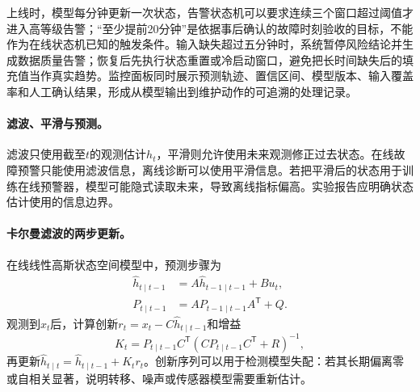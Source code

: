 上线时，模型每分钟更新一次状态，告警状态机可以要求连续三个窗口超过阈值才进入高等级告警；“至少提前20分钟”是依据事后确认的故障时刻验收的目标，不能作为在线状态机已知的触发条件。输入缺失超过五分钟时，系统暂停风险结论并生成数据质量告警；恢复后先执行状态重置或冷启动窗口，避免把长时间缺失后的填充值当作真实趋势。监控面板同时展示预测轨迹、置信区间、模型版本、输入覆盖率和人工确认结果，形成从模型输出到维护动作的可追溯的处理记录。

\paragraph{滤波、平滑与预测。}
滤波只使用截至$t$的观测估计$h_t$，平滑则允许使用未来观测修正过去状态。在线故障预警只能使用滤波信息，离线诊断可以使用平滑信息。若把平滑后的状态用于训练在线预警器，模型可能隐式读取未来，导致离线指标偏高。实验报告应明确状态估计使用的信息边界。

\paragraph{卡尔曼滤波的两步更新。}
在线线性高斯状态空间模型中，预测步骤为
\begin{align}
 \hat h_{t\mid t-1}&=A\hat h_{t-1\mid t-1}+Bu_t,\\
 P_{t\mid t-1}&=AP_{t-1\mid t-1}A^{\mathsf T}+Q.
\end{align}
观测到$x_t$后，计算创新$r_t=x_t-C\hat h_{t\mid t-1}$和增益
\begin{equation}
 K_t=P_{t\mid t-1}C^{\mathsf T}(CP_{t\mid t-1}C^{\mathsf T}+R)^{-1},
\end{equation}
再更新$\hat h_{t\mid t}=\hat h_{t\mid t-1}+K_tr_t$。创新序列可以用于检测模型失配：若其长期偏离零或自相关显著，说明转移、噪声或传感器模型需要重新估计。

